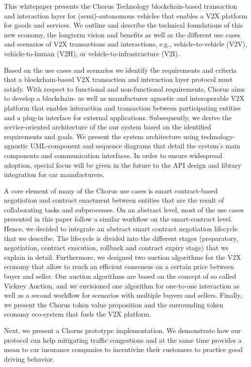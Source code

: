 \documentclass{llncs}
\begin{document}
{		This whitepaper presents the Chorus Technology blockchain-based transaction and interaction layer for (semi)-autonomous vehicles that enables a V2X platform for goods and services. We outline and describe the technical foundations of this new economy, the longterm vision and benefits as well as the different use cases and scenarios of V2X transactions and interactions, e.g., vehicle-to-vehicle (V2V), vehicle-to-human (V2H), or vehicle-to-infrastructure (V2I).
		
		Based on the use cases and scenarios we identify the requirements and criteria that a blockchain-based V2X transaction and interaction layer protocol must satisfy. With respect to functional and non-functional requirements, Chorus aims to develop a blockchain- as well as manufacturer agnostic and interoperable V2X platform that enables interaction and transaction between participating entities and a plug-in interface for external applications.
		Subsequently, we derive the service-oriented architecture of the our system based on the identified requirements and goals. We present the system architecture using technology-agnostic UML-component and sequence diagrams that detail the system’s main components and communication interfaces. In order to ensure widespread adoption, special focus will be given in the future to the API design and library integration for car manufacturers.
		
		A core element of many of the Chorus use cases is smart contract-based negotiation and contract enactment between
		entities that are the result of collaborating tasks and subprocesses. On an abstract level, most of the use cases presented in this paper follow a similar workflow on the smart-contract level. Hence, we decided to integrate an abstract smart contract negotiation lifecycle that we describe. The lifecycle is divided into the different stages (preparatory, negotiation, contract execution, rollback and contract expiry stage) that we explain in detail. Furthermore, we designed two auction algorithms for the V2X economy that allow to reach an efficient consensus on a certain price between buyer and seller. Our auction algorithms are based on the concept of so called Vickrey Auction, and we envisioned one algorithm for one-to-one interaction as well as a second workflow for scenarios with multiple buyers and sellers. Finally, we present the Chorus token value proposition and the surrounding token economy eco-system that fuels the V2X platform.
		
		Next, we present a Chorus prototype implementation. We demonstrate how our protocol can help mitigating traffic congestions and at the same time provides a mean to car insurance companies to incentivize their customers to practice good driving behavior. 	
		
}
\end{document}
